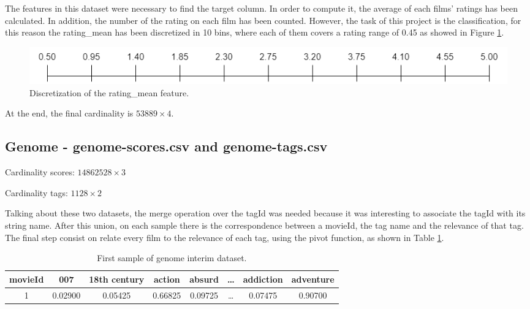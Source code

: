 \documentclass[../main]{subfiles}
\begin{document}
The features in this dataset were necessary to find the target column.
In order to compute it, the average of each films' ratings has been calculated.
In addition, the number of the rating on each film has been counted.
However, the task of this project is the classification, for this reason the rating\_mean has been discretized in 10 bins, where each of them covers a rating range of 0.45 as showed in Figure \ref{fig:rating_mean_discretized}.

\begin{figure}[h]
    \center
    \includegraphics[width=\linewidth]{figures/step_rating_mean_discretized.png}
    \caption{Discretization of the rating\_mean feature.}
    \label{fig:rating_mean_discretized}
\end{figure}

At the end, the final cardinality is $53889 \times 4$.

\subsection*{Genome - genome-scores.csv and genome-tags.csv}
Cardinality scores: $14862528 \times 3$

\noindent
Cardinality tags: $1128 \times 2$

Talking about these two datasets, the merge operation over the tagId was needed because it was interesting to associate the tagId with its string name.
After this union, on each sample there is the correspondence between a movieId, the tag name and the relevance of that tag.
The final step consist on relate every film to the relevance of each tag, using the pivot function, as shown in Table \ref{table:genome-first-sample}.
\begin{table}[h]
    \center
    \begin{tabular}{|c|c|c|c|c|c|c|c|}
    \hline
    \textbf{movieId} & \textbf{007}     & \textbf{18th century} & \textbf{action}  & \textbf{absurd} & \textbf{\dots} & \textbf{addiction} & \textbf{adventure} \\
    \hline
    1       & 0.02900 & 0.05425      & 0.66825 & 0.09725          & \dots & 0.07475   & 0.90700 \\
    \hline
    \end{tabular}
    \caption{First sample of genome interim dataset.}
    \label{table:genome-first-sample}
\end{table}
\end{document}
